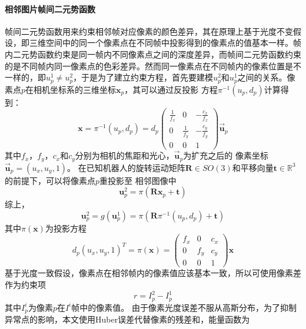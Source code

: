 \paragraph{相邻图片帧间二元势函数}
帧间二元势函数用来约束相邻帧对应像素的颜色差异，其在原理上基于光度不变假设，即三维空间中的同一个像素点在不同帧中投影得到的像素点的值基本一样。帧内二元势函数约束是同一帧内不同像素点之间的深度差异，而帧间二元势函数约束的是不同帧内同一像素点的色彩差异。然而同一像素点在不同帧内的像素位置是不一样的，即$u_p^1 \neq u_p^2$，于是为了建立约束方程，首先要建模$u_p^2$和$u_p^1$之间的关系。像素点$p$在相机坐标系的三维坐标$\mathbf{x}_p$，其可以通过反投影
方程$\pi^{-1}(u_p,d_p)$计算得到：
\begin{equation}
    \mathbf{x} = \pi^{-1}(u_p,d_p) = d_p
    \begin{pmatrix}
        \frac{1}{f_x} & 0  &-\frac{c_x}{f_x}\\
        0   &\frac{1}{f_y} &-\frac{c_y}{f_y}\\
        0 & 0 & 1 
    \end{pmatrix} \vec{\mathbf{u}}_p
\end{equation}
其中$f_x$，$f_y$，$c_x$和$c_y$分别为相机的焦距和光心，$\vec{\mathbf{u}}_p$为扩充之后的
像素坐标$\vec{\mathbf{u}}_p=(u_x,u_y,1)$。
在已知机器人的旋转运动矩阵$\mathbf{R}\in SO(3)$和平移向量$\mathbf{t} \in \mathbb{R}^3$的前提下，可以将像素点$p$重投影至
相邻图像中
\begin{equation}
    \mathbf{u}^2_p = \pi(\mathbf{R}\mathbf{x}_p+\mathbf{t})
\end{equation}
综上，
\begin{equation}
    \mathbf{u}^2_p = g(\mathbf{u}_p^1) = \pi(\mathbf{R}\pi^{-1}(u_p,d_p)+\mathbf{t})
\end{equation}
其中$\pi(\mathbf{x})$为投影方程
\begin{equation}
    d_p(u_x,u_y,1)^T = \pi(\mathbf{x}) = 
    \begin{pmatrix}
       f_x & 0  &c_x\\
        0  &f_y &c_y\\
        0 & 0 & 1 
    \end{pmatrix} \mathbf{x}
\end{equation}
基于光度一致假设，像素点在相邻帧内的像素值应该基本一致，所以可使用像素差作为约束项
\begin{equation}
    r = I^2_p - I^1_p
\end{equation}
其中$I^i_p$为像素$p$在$I^i$帧中的像素值。
由于像素光度误差不服从高斯分布，为了抑制异常点的影响，本文使用Huber误差\cite{huber1992robust}代替像素的残差和，能量函数为
